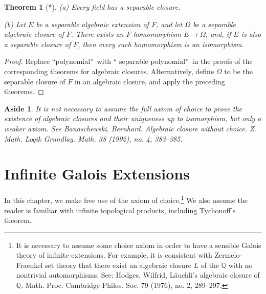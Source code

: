 \documentclass[a4paper,11pt,final,openany]{memoir}
\newtheorem{theorem}[X]{Theorem}
\newtheorem{aside}[X]{Aside}
\theoremstyle{nonumberplain}
\newtheorem{proof}{Proof.}
\begin{document}
\begin{theorem}
[*]\label{sf19}(a) Every field has a separable closure.

(b) Let $E$ be a separable algebraic extension of $F$, and let $\Omega$ be a
separable algebraic closure of $F$. There exists an $F$-homomorphism
$E\rightarrow\Omega$, and, if $E$ is also a separable closure of $F$, then
every such homomorphism is an isomorphism.
\end{theorem}

\begin{proof}
Replace \textquotedblleft polynomial\textquotedblright\ with \textquotedblleft
separable polynomial\textquotedblright\ in the proofs of the corresponding
theorems for algebraic closures. Alternatively, define $\Omega$ to be the
separable closure of $F$ in an algebraic closure, and apply the preceding theorems.
\end{proof}

\begin{aside}
\label{sf19a}It is not necessary to assume the full axiom of choice to prove
the existence of algebraic closures and their uniqueness up to isomorphism,
but only a weaker axiom. See Banaschewski, Bernhard. Algebraic closure without
choice. Z. Math. Logik Grundlag. Math. 38 (1992), no. 4, 383--385.
\end{aside}

\clearpage


\chapter{Infinite Galois Extensions}

In this chapter, we make free use of the axiom of choice.\footnote{It is
necessary to assume some choice axiom in order to have a sensible Galois
theory of infinite extensions. For example, it is consistent with
Zermelo-Fraenkel set theory that there exist an algebraic closure $L$ of the
$\mathbb{Q}$ with no nontrivial automorphisms. See: Hodges, Wilfrid,
L\"{a}uchli's algebraic closure of $\mathbb{Q}$. Math. Proc. Cambridge Philos.
Soc. 79 (1976), no. 2, 289--297.} We also assume the reader is familiar with
infinite topological products, including Tychonoff's theorem.
\end{document}
